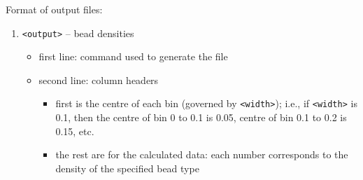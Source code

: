 \noindent
Format of output files:
\begin{enumerate}[nosep,leftmargin=20pt]
  \item \texttt{<output>} -- bead densities
    \begin{itemize}[nosep,leftmargin=5pt]
      \item first line: command used to generate the file
      \item second line: column headers
        \begin{itemize}[nosep,leftmargin=5pt]
          \item first is the centre of each bin (governed by
            \texttt{<width>}); i.e., if \texttt{<width>} is 0.1,
            then the centre of bin 0 to 0.1 is 0.05, centre of bin 0.1 to
            0.2 is 0.15, etc.
          \item the rest are for the calculated data: each number
            corresponds to the density of the specified bead type
        \end{itemize}
    \end{itemize}
\end{enumerate}
